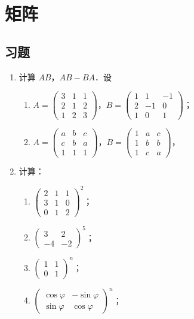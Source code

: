 \chapter{矩阵}
\section{习题}
\begin{enumerate}
  \item 计算 $AB$，$AB-BA$．设
  \begin{enumerate}
    \item $A=\begin{pmatrix}3&1&1\\2&1&2\\1&2&3\end{pmatrix}$，$B=\begin{pmatrix}1&1&-1\\2&-1&0\\1&0&1\end{pmatrix}$；
  \anssub
    \item $A=\begin{pmatrix}a&b&c\\c&b&a\\1&1&1\end{pmatrix}$，$B=\begin{pmatrix}1&a&c\\1&b&b\\1&c&a\end{pmatrix}$，
  \anssub
  \end{enumerate}
  \item 计算：
  \begin{enumerate}
    \item $\begin{pmatrix}2&1&1\\3&1&0\\0&1&2\end{pmatrix}^2$；
  \anssub
    \item $\begin{pmatrix}3&2\\-4&-2\end{pmatrix}^5$；
  \anssub
    \item $\begin{pmatrix}1&1\\0&1\end{pmatrix}^n$；
  \anssub
    \item $\begin{pmatrix}\cos\varphi&-\sin\varphi\\\sin\varphi&\cos\varphi\end{pmatrix}^n$；

\end{enumerate}
\end{enumerate}
